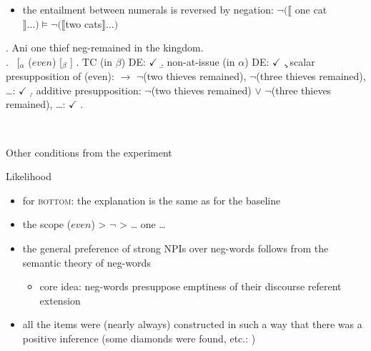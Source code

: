 \documentclass[
  ignorenonframetext,
]{beamer}
\providecommand{\tightlist}{%
  \setlength{\itemsep}{0pt}\setlength{\parskip}{0pt}}\usepackage{longtable,booktabs,array}
\begin{document}
\begin{frame}
\begin{itemize}
\tightlist
\item
  the entailment between numerals is reversed by negation:
  \(\neg (\llbracket\) one cat
  \(\rrbracket \ldots) \models \neg(\llbracket\)two
  cats\(\rrbracket \ldots)\)
\end{itemize}

\ex. Ani one thief neg-remained in the kingdom.\\
\a. ~{[}\(_\alpha\) (\(even\)) {[}\(_\beta\)
\neg [$_\gamma$ ani one thief remained in the kingdom ]{]} {]} \a. TC
(in \(\beta\)) DE: \(\checkmark\) \b. non-at-issue (in \(\alpha\)) DE:
\(\checkmark\) \c. scalar presupposition of (even): \(\rightarrow\)
\(\neg\)(two thieves remained), \(\neg\)(three thieves remained),
\ldots: \(\checkmark\) \d. additive presupposition: \(\neg\)(two thieves
remained) \(\vee\) \(\neg\)(three thieves remained), \ldots:
\(\checkmark\) \z.

~
\end{frame}

\begin{frame}
\begin{block}{Other conditions from the experiment}
\protect\hypertarget{other-conditions-from-the-experiment}{}
\begin{block}{Likelihood}
\protect\hypertarget{likelihood}{}
\begin{itemize}
\tightlist
\item
  for \textsc{bottom}: the explanation is the same as for the baseline
\item
  the scope (\(even\)) \textgreater{} \(\neg\) \textgreater{} \ldots{}
  one \ldots{}
\item
  the general preference of strong NPIs over neg-words follows from the
  semantic theory of neg-words

  \begin{itemize}
  \tightlist
  \item
    core idea: neg-words presuppose emptiness of their discourse
    referent extension
  \end{itemize}
\item
  all the items were (nearly always) constructed in such a way that
  there was a positive inference (some diamonds were found, etc.: )
\end{itemize}
\end{block}
\end{block}
\end{frame}
\end{document}
